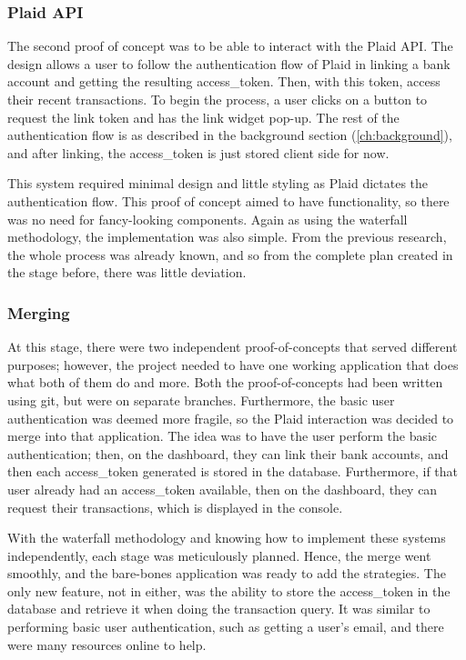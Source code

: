 \subsubsection{Plaid API}
The second proof of concept was to be able to interact with the Plaid API. The design allows a user to follow the authentication flow of Plaid in linking a bank account and getting the resulting access\_token. Then, with this token, access their recent transactions. To begin the process, a user clicks on a button to request the link token and has the link widget pop-up. The rest of the authentication flow is as described in the background section (\ref{ch:background}), and after linking, the access\_token is just stored client side for now.

This system required minimal design and little styling as Plaid dictates the authentication flow. This proof of concept aimed to have functionality, so there was no need for fancy-looking components. Again as using the waterfall methodology, the implementation was also simple. From the previous research, the whole process was already known, and so from the complete plan created in the stage before, there was little deviation.

\subsubsection{Merging}
At this stage, there were two independent proof-of-concepts that served different purposes; however, the project needed to have one working application that does what both of them do and more. Both the proof-of-concepts had been written using git, but were on separate branches. Furthermore, the basic user authentication was deemed more fragile, so the Plaid interaction was decided to merge into that application. The idea was to have the user perform the basic authentication; then, on the dashboard, they can link their bank accounts, and then each access\_token generated is stored in the database. Furthermore, if that user already had an access\_token available, then on the dashboard, they can request their transactions, which is displayed in the console.

With the waterfall methodology and knowing how to implement these systems independently, each stage was meticulously planned. Hence, the merge went smoothly, and the bare-bones application was ready to add the strategies. The only new feature, not in either, was the ability to store the access\_token in the database and retrieve it when doing the transaction query. It was similar to performing basic user authentication, such as getting a user's email, and there were many resources online to help.

